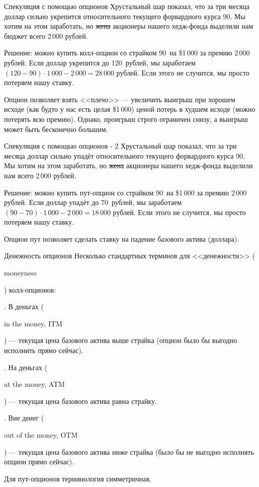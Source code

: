 \documentclass{beamer}
\newcommand{\en}[1]{\begin{otherlanguage}{english}#1\end{otherlanguage}}
\newcommand{\usdrubstrike}{90}
\newcommand{\usdrublow}{70}
\newcommand{\usdrubhigh}{120}
\newcommand{\highminusstrikepremium}{28}
\newcommand{\strikeminuslowpremium}{18}
\begin{document}
\begin{frame}{Спекуляция с помощью опционов}
\justify
Хрустальный шар показал, что за три месяца доллар сильно укрепится относительного текущего форвардного курса \usdrubstrike. Мы хотим на этом заработать, но \sout{жена} акционеры нашего хедж-фонда выделили нам бюджет всего 2\,000 рублей.

\justify
Решение: можно купить колл-опцион со страйком \usdrubstrike\ на \$1\,000 за премию 2\,000 рублей. Если доллар укрепится до \usdrubhigh\ рублей, мы заработаем $(\usdrubhigh - \usdrubstrike) \cdot 1\,000 - 2\,000 = \highminusstrikepremium\,000$ рублей. Если этого не случится, мы просто потеряем нашу ставку.

\justify
Опцион позволяет взять <<плечо>> --- увеличить выигрыш при хорошем исходе (как будто у нас есть целая \$1\,000) ценой потерь в худшем исходе (можно потерять всю премию). Однако, проигрыш строго ограничен снизу, а выигрыш может быть бесконечно большим.
\end{frame}



\begin{frame}{Спекуляция с помощью опционов - 2}
\justify
Хрустальный шар показал, что за три месяца доллар сильно упадёт относительного текущего форвардного курса \usdrubstrike. Мы хотим на этом заработать, но \sout{жена} акционеры нашего хедж-фонда выделили нам всего 2\,000 рублей.

\justify
Решение: можно купить пут-опцион со страйком \usdrubstrike\ на \$1\,000 за премию 2\,000 рублей. Если доллар упадёт до \usdrublow\ рублей, мы заработаем $(\usdrubstrike - \usdrublow) \cdot 1\,000 - 2\,000 = \strikeminuslowpremium\,000$ рублей. Если этого не случится, мы просто потеряем нашу ставку.

\justify
Опцион пут позволяет сделать ставку на падение базового актива (доллара).
\end{frame}



\begin{frame}{Денежность опционов}
\justify
Несколько стандартных терминов для <<денежности>> (\en{moneyness}) колл-опционов:

. В деньгах (\en{in the money, ITM}) --- текущая цена базового актива выше страйка (опцион было бы выгодно исполнить прямо сейчас).

. На деньгах (\en{at the money, ATM}) --- текущая цена базового актива равна страйку.

. Вне денег (\en{out of the money, OTM}) --- текущая цена базового актива ниже страйка (было бы не выгодно исполнять опцион прямо сейчас).

\justify
Для пут-опционов терминология симметричная.
\end{frame}
\end{document}
